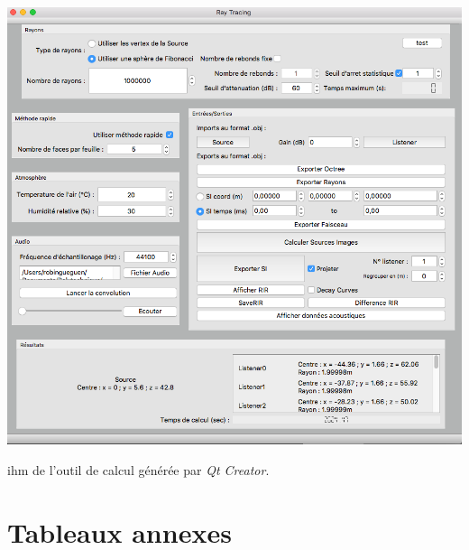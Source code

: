\begin{figureth}
	\includegraphics[width=\linewidth]{images/ihm}
	\caption{\gls{ihm} de l'outil de calcul générée par \textit{Qt Creator}.}
	\label{ihm}
\end{figureth}

\section{Tableaux annexes}


